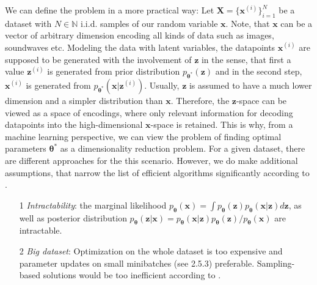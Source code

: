 \documentclass[12pt]{report}
\theoremstyle{definition}
\begin{document}
We can define the problem in a more practical way: Let $\mathbf{X} = \{ \mathbf{x}^{(i)}\}_{i=1}^N$ be a dataset with $N \in \mathbb{N}$ i.i.d. samples of our random variable $\mathbf{x}$. Note, that $\mathbf{x}$ can be a vector of arbitrary dimension encoding all kinds of data such as images, soundwaves etc. Modeling the data with latent variables, the datapoints $\mathbf{x}^{(i)}$ are supposed to be generated with the involvement of $\mathbf{z}$ in the sense, that first a value $\mathbf{z}^{(i)}$ is generated from prior distribution $p_{\pmb{\theta}^*}(\mathbf{z})$ and in the second step, $\mathbf{x}^{(i)}$ is generated from $p_{\pmb{\theta}^*}(\mathbf{x}|\mathbf{z}^{(i)})$.
Usually, $\mathbf{z}$ is assumed to have a much lower dimension and a simpler distribution than $\mathbf{x}$. Therefore, the $\mathbf{z}$-space can be viewed as a space of encodings, where only relevant information for decoding datapoints into the high-dimensional $\mathbf{x}$-space is retained. This is why, from a machine learning perspective, we can view the problem of finding optimal parameters $\pmb{\theta}^*$ as a dimensionality reduction problem.
For a given dataset, there are different approaches for the this scenario. However, we do make additional assumptions, that narrow the list of efficient algorithms significantly according to \cite{kingma1}.

\begin{itemize}
	\item[1] \emph{Intractability}: the marginal likelihood $p_{\pmb{\theta}}(\mathbf{x}) = \int p_{\pmb{\theta}}(\mathbf{z}) p_{\pmb{\theta}}(\mathbf{x}|\mathbf{z}) d \mathbf{z}$, as well as posterior distribution $p_{\pmb{\theta}}(\mathbf{z}|\mathbf{x}) = p_{\pmb{\theta}}(\mathbf{x}|\mathbf{z}) p_{\pmb{\theta}}(\mathbf{z}) / p_{\pmb{\theta}}(\mathbf{x})$ are intractable.
	\item[2] \emph{Big dataset}: Optimization on the whole dataset is too expensive and parameter updates on small minibatches (see 2.5.3) preferable. Sampling-based solutions would be too inefficient according to \cite{kingma1}.
\end{itemize}
\end{document}
